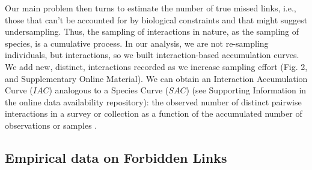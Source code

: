 \documentclass[12pt]{article}
\begin{document}
Our main problem then turns to estimate the number of true missed links, i.e., those that can't be accounted for by biological constraints and that might suggest undersampling. Thus, the sampling of interactions in nature, as the sampling of species, is a cumulative process. In our analysis, we are not re-sampling individuals, but interactions, so we built interaction-based accumulation curves. We add new, distinct, interactions recorded as we increase sampling effort (Fig. 2, and Supplementary Online Material). We can obtain an Interaction Accumulation Curve ($IAC$) analogous to a Species Curve ($SAC$) (see Supporting Information in the online data availability repository): the observed number of distinct pairwise interactions in a survey or collection as a function of the accumulated number of observations or samples \citep{Colwell:2009gv}. 

\subsection*{Empirical data on Forbidden Links}
\end{document}

